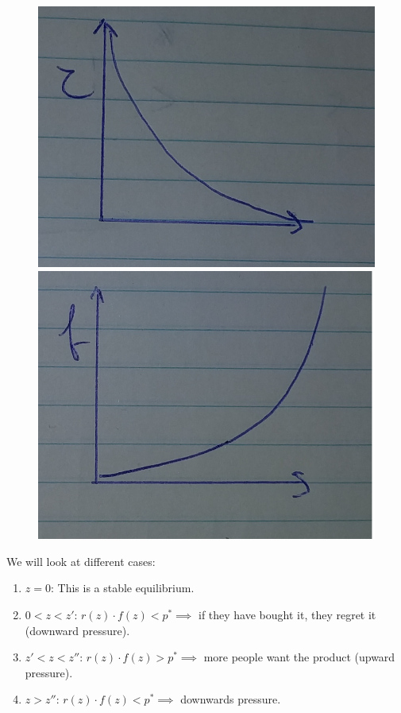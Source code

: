 \documentclass[12pt]{scrartcl}
\begin{document}
\begin{figure}[h]
  \centering
  \begin{minipage}[h]{0.49\textwidth}
    \includegraphics[width=\textwidth]{./images/graph_r.png}
  \end{minipage}
  \hfill
  \begin{minipage}[h]{0.49\textwidth}
    \includegraphics[width=\textwidth]{./images/graph_f.png}
  \end{minipage}
\end{figure}

\noindent We will look at different cases:
\begin{enumerate}
\item $z = 0$: This is a stable equilibrium.
\item $ 0 < z < z'$: $r(z)\cdot f(z) < p^{*} \implies$ if they have bought it, they regret it (downward pressure).
\item $z'< z < z''$: $r(z)\cdot f(z) > p^{*} \implies$ more people want the product (upward pressure).
\item $z > z''$: $r(z)\cdot f(z) < p^{*} \implies$ downwards pressure. 
\end{enumerate}
\end{document}
